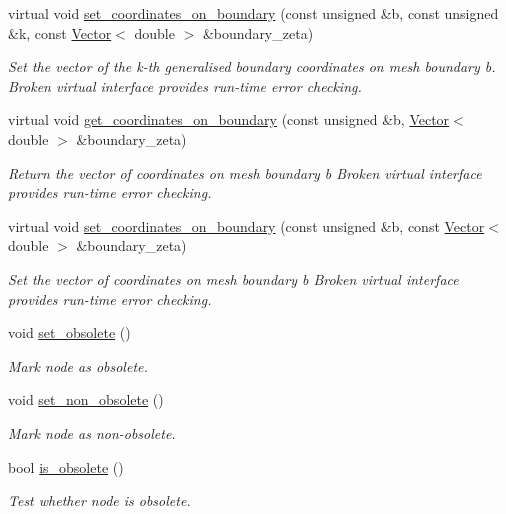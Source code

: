 \begin{DoxyCompactItemize}
virtual void \hyperlink{classoomph_1_1Node_a94c19e165ab4e88aabbfa27443c530b7}{set\+\_\+coordinates\+\_\+on\+\_\+boundary} (const unsigned \&b, const unsigned \&k, const \hyperlink{classoomph_1_1Vector}{Vector}$<$ double $>$ \&boundary\+\_\+zeta)
\begin{DoxyCompactList}\small\item\em Set the vector of the k-\/th generalised boundary coordinates on mesh boundary b. Broken virtual interface provides run-\/time error checking. \end{DoxyCompactList}\item 
virtual void \hyperlink{classoomph_1_1Node_a6db0c3e8349aa231c3c56cdbfb720e1c}{get\+\_\+coordinates\+\_\+on\+\_\+boundary} (const unsigned \&b, \hyperlink{classoomph_1_1Vector}{Vector}$<$ double $>$ \&boundary\+\_\+zeta)
\begin{DoxyCompactList}\small\item\em Return the vector of coordinates on mesh boundary b Broken virtual interface provides run-\/time error checking. \end{DoxyCompactList}\item 
virtual void \hyperlink{classoomph_1_1Node_a089465d789baa423cd30b3a792ad1e9e}{set\+\_\+coordinates\+\_\+on\+\_\+boundary} (const unsigned \&b, const \hyperlink{classoomph_1_1Vector}{Vector}$<$ double $>$ \&boundary\+\_\+zeta)
\begin{DoxyCompactList}\small\item\em Set the vector of coordinates on mesh boundary b Broken virtual interface provides run-\/time error checking. \end{DoxyCompactList}\item 
void \hyperlink{classoomph_1_1Node_a2f19488a7967f963b073b93dc12728ab}{set\+\_\+obsolete} ()
\begin{DoxyCompactList}\small\item\em Mark node as obsolete. \end{DoxyCompactList}\item 
void \hyperlink{classoomph_1_1Node_a6dfc895be93214f4a880c1e9e7a3b4a6}{set\+\_\+non\+\_\+obsolete} ()
\begin{DoxyCompactList}\small\item\em Mark node as non-\/obsolete. \end{DoxyCompactList}\item 
bool \hyperlink{classoomph_1_1Node_a2b1ff7b3b709fbf575ff27983483d9a2}{is\+\_\+obsolete} ()
\begin{DoxyCompactList}\small\item\em Test whether node is obsolete. \end{DoxyCompactList}\item 

\end{DoxyCompactItemize}

